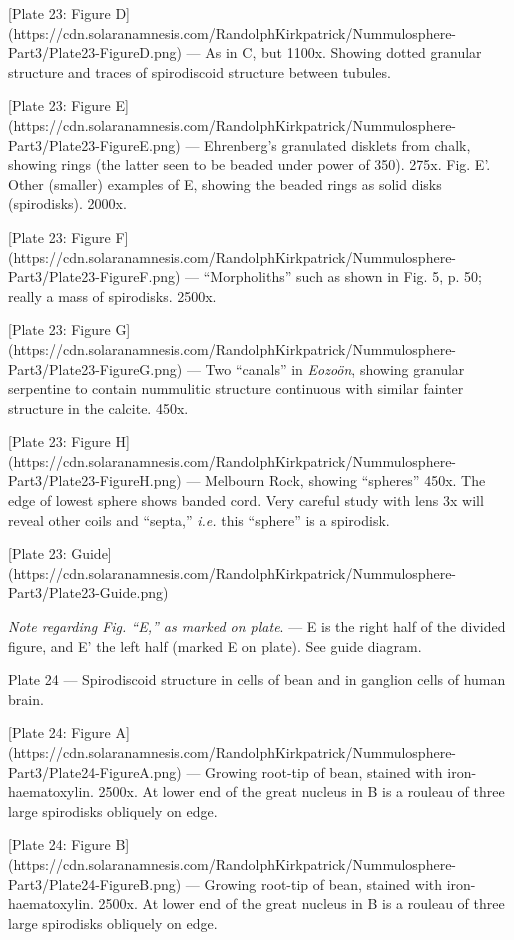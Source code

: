 \documentclass[a4paper, 12pt, oneside]{article}
\begin{document}
[Plate 23: Figure D](https://cdn.solaranamnesis.com/RandolphKirkpatrick/Nummulosphere-Part3/Plate23-FigureD.png) --- As in C, but 1100x. Showing dotted granular structure and traces of spirodiscoid structure between tubules.

[Plate 23: Figure E](https://cdn.solaranamnesis.com/RandolphKirkpatrick/Nummulosphere-Part3/Plate23-FigureE.png) --- Ehrenberg's granulated disklets from chalk, showing rings (the latter seen to be beaded under power of 350). 275x. Fig. E'. Other (smaller) examples of E, showing the beaded rings as solid disks (spirodisks). 2000x.

[Plate 23: Figure F](https://cdn.solaranamnesis.com/RandolphKirkpatrick/Nummulosphere-Part3/Plate23-FigureF.png) --- ``Morpholiths'' such as shown in Fig. 5, p. 50; really a mass of spirodisks. 2500x.

[Plate 23: Figure G](https://cdn.solaranamnesis.com/RandolphKirkpatrick/Nummulosphere-Part3/Plate23-FigureG.png) --- Two ``canals'' in \emph{Eozoön}, showing granular serpentine to contain nummulitic structure continuous with similar fainter structure in the calcite. 450x.

[Plate 23: Figure H](https://cdn.solaranamnesis.com/RandolphKirkpatrick/Nummulosphere-Part3/Plate23-FigureH.png) --- Melbourn Rock, showing ``spheres'' 450x. The edge of lowest sphere shows banded cord. Very careful study with lens 3x will reveal other coils and ``septa,'' \emph{i.e.} this ``sphere'' is a spirodisk.

[Plate 23: Guide](https://cdn.solaranamnesis.com/RandolphKirkpatrick/Nummulosphere-Part3/Plate23-Guide.png)

\emph{Note regarding Fig. ``E,'' as marked on plate}. --- E is the right half of the divided figure, and E' the left half (marked E on plate). See guide diagram.

Plate 24 --- Spirodiscoid structure in cells of bean and in ganglion cells of human brain.

[Plate 24: Figure A](https://cdn.solaranamnesis.com/RandolphKirkpatrick/Nummulosphere-Part3/Plate24-FigureA.png) --- Growing root-tip of bean, stained with iron-haematoxylin. 2500x. At lower end of the great nucleus in B is a rouleau of three large spirodisks obliquely on edge.

[Plate 24: Figure B](https://cdn.solaranamnesis.com/RandolphKirkpatrick/Nummulosphere-Part3/Plate24-FigureB.png) --- Growing root-tip of bean, stained with iron-haematoxylin. 2500x. At lower end of the great nucleus in B is a rouleau of three large spirodisks obliquely on edge.
\end{document}
